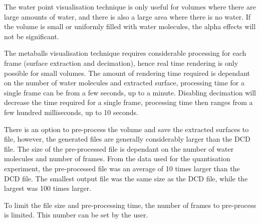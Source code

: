 The water point visualisation technique is only useful for volumes where there
are large amounts of water, and there is also a large area where there is no
water. If the volume is small or uniformly filled with water molecules, the
alpha effects will not be significant.

The metaballs visualisation technique requires considerable processing for each
frame (surface extraction and decimation), hence real time rendering is only
possible for small volumes. The amount of rendering time required is dependant
on the number of water molecules and extracted surface, processing time for a
single frame can be from a few seconds, up to a minute. Disabling decimation
will decrease the time required for a single frame, processing time then ranges
from a few hundred milliseconds, up to 10 seconds.

There is an option to pre-process the volume and save the extracted surfaces to
file, however, the generated files are generally considerably larger than the
DCD file. The size of the pre-processed file is dependant on the number of
water molecules and number of frames. From the data used for the quantisation
experiment, the pre-processed file was an average of 10 times larger than the
DCD file. The smallest output file was the same size as the DCD file, while the
largest was 100 times larger.

To limit the file size and pre-processing time, the number of frames to
pre-process is limited. This number can be set by the user.



